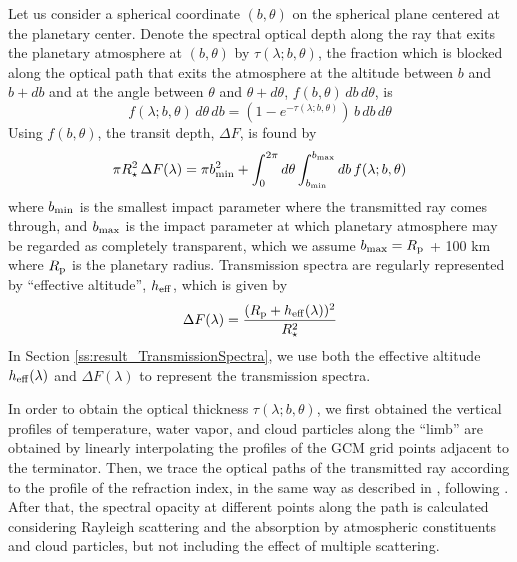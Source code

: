 \documentclass[11pt,numberedappendix,twocolappendix,]{emulateapj}
\begin{document}
Let us consider a spherical coordinate $(b, \theta )$ on the spherical plane centered at the planetary center. 
Denote the spectral optical depth along the ray that exits the planetary atmosphere at $(b, \theta )$ by $\tau (\lambda; b, \theta )$, 
the fraction which is blocked along the optical path that exits the atmosphere at the altitude between $b$ and $b+db$ and at the angle between $\theta $ and $\theta + d\theta $, $f(b, \theta ) \, db \, d\theta$, is 
\begin{equation}
f(\lambda; b, \theta ) \, d\theta \, db = ( 1 - e^{-\tau (\lambda; b, \theta )} ) \, b \, db \, d\theta 
\end{equation}
Using $f(b, \theta )$, the transit depth, $\Delta F$, is found by
\begin{equation}
\pi R_{\star } ^2 \, \Delta F (\lambda) = \pi b_{\rm min}^2 + \int_0^{2\pi} d\theta \int_{b_{\rm min}}^{b_{\rm max}} db \, f(\lambda; b, \theta )
\end{equation}
where $b_{\rm min}$ is the smallest impact parameter where the transmitted ray comes through, and $b_{\rm max}$ is the impact parameter at which planetary atmosphere may be regarded as completely transparent, which we assume $b_{\rm max} = R_{\rm p}$ + 100 km where $R_{\rm p}$ is the planetary radius. 
Transmission spectra are regularly represented by ``effective altitude'', $h_{\rm eff}$, which is given by
\begin{equation}
\Delta F(\lambda) = \frac{( R_{\rm p} + h_{\rm eff}(\lambda)  )^2}{R_{\star }^2}
\end{equation}
In Section \ref{ss:result_TransmissionSpectra}, we use both the effective altitude $h_{\rm eff}  (\lambda)$ and $\Delta F (\lambda)$ to represent the transmission spectra. 

In order to obtain the optical thickness $\tau (\lambda; b, \theta )$, we first  obtained the vertical profiles of temperature, water vapor, and cloud particles along the ``limb'' are obtained by linearly interpolating the profiles of the GCM grid points adjacent to the terminator. 
Then, we trace the optical paths of the transmitted ray according to the profile of the refraction index, in the same way as described in \citet{vanderWerf2008}, following \citet{Misra2014}. 
After that, the spectral opacity at different points along the path is calculated considering Rayleigh scattering and the absorption by atmospheric constituents and cloud particles, but not including the effect of multiple scattering. 
\end{document}
